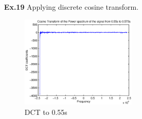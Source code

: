 \documentclass[a4paper]{article}
\begin{document}
\begin{enumerate}
	\item[\textbf{Ex.19}] Applying discrete cosine transform.
	\begin{figure}[H]
		\begin{center}
			\includegraphics[width=0.52\textwidth]{ex19.eps}
			\caption{DCT to 0.55s}\label{fig:dct}	
		\end{center}
	\end{figure}
\end{enumerate}

%


\end{document}
